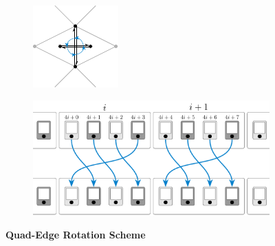 \documentclass{stdlocal}
\begin{document}
\begin{figure}
  \centering
  \begin{subfigure}[b]{0.31\linewidth}
    \centering
    \includegraphics[width=\linewidth]{figures/quad-edge-rot.pdf}
  \end{subfigure}
  \hfill
  \begin{subfigure}[b]{0.67\linewidth}
    \centering
    \includegraphics[width=\linewidth]{figures/quad-edge-struct-rot.pdf}
  \end{subfigure}
  \caption[Quad-Edge Rotation Scheme]{
    \textbf{Quad-Edge Rotation Scheme}\\
  }
\end{figure}

\end{document}
